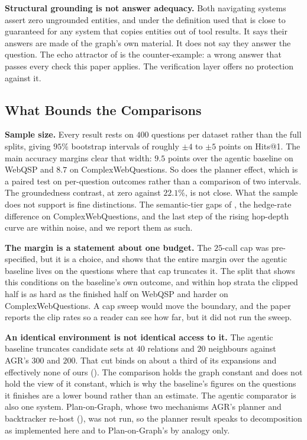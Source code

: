 \textbf{Structural grounding is not answer adequacy.} Both navigating
systems assert zero ungrounded entities, and under the definition used
that is close to guaranteed for any system that copies entities out of
tool results. It says their answers are made of the graph's own
material. It does not say they answer the question. The echo attractor
of  is the counter-example: a wrong answer that passes
every check this paper applies. The verification layer offers no
protection against it.

\subsection{What Bounds the Comparisons}\label{sec:limits-comparison}

\textbf{Sample size.} Every result rests on $400$ questions per dataset
rather than the full splits, giving $95\%$ bootstrap intervals of
roughly $\pm4$ to $\pm5$ points on Hits@1. The main accuracy margins
clear that width: $9.5$ points over the agentic baseline on WebQSP and
$8.7$ on ComplexWebQuestions. So does the planner effect, which is a
paired test on per-question outcomes rather than a comparison of two
intervals. The groundedness contrast, at zero against $22.1\%$, is not
close. What the sample does not support is fine distinctions. The
semantic-tier gaps of , the hedge-rate difference
on ComplexWebQuestions, and the last step of the rising hop-depth curve
are within noise, and we report them as such.

\textbf{The margin is a statement about one budget.} The $25$-call cap
was pre-specified, but it is a choice, and  shows that
the entire margin over the agentic baseline lives on the questions where
that cap truncates it. The split that shows this conditions on the
baseline's own outcome, and within hop strata the clipped half is as
hard as the finished half on WebQSP and harder on ComplexWebQuestions. A
cap sweep would move the boundary, and the paper reports the clip rates
so a reader can see how far, but it did not run the sweep.

\textbf{An identical environment is not identical access to it.} The
agentic baseline truncates candidate sets at $40$ relations and $20$
neighbours against AGR's $300$ and $200$. That cut binds on about a
third of its expansions and effectively none of ours
(). The comparison holds the graph constant and does
not hold the view of it constant, which is why the baseline's figures on
the questions it finishes are a lower bound rather than an estimate. The
agentic comparator is also one system. Plan-on-Graph, whose two
mechanisms AGR's planner and backtracker re-host
(), was not run, so the planner result speaks to
decomposition as implemented here and to Plan-on-Graph's by analogy
only.

